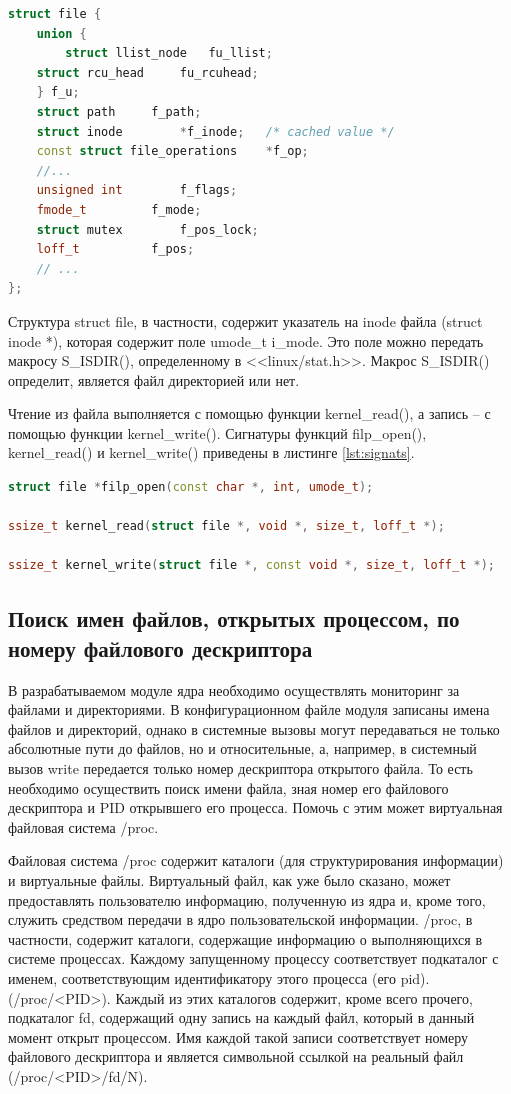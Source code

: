 \documentclass[a4paper,14pt]{article}
\begin{document}
\begin{lstlisting}[language=C++,label={lst:sfile}, caption=\text{struct file для ядра версии 5.4.}]
struct file {
	union {
		struct llist_node	fu_llist;
	struct rcu_head 	fu_rcuhead;
	} f_u;
	struct path		f_path;
	struct inode		*f_inode;	/* cached value */
	const struct file_operations	*f_op;
	//...
	unsigned int 		f_flags;
	fmode_t			f_mode;
	struct mutex		f_pos_lock;
	loff_t			f_pos;
	// ...
};
\end{lstlisting}

Структура struct file, в частности, содержит указатель на inode файла (struct inode *), которая содержит поле umode\_t i\_mode. Это поле можно передать макросу S\_ISDIR(), определенному в <<linux/stat.h>>. Макрос S\_ISDIR() определит, является файл директорией или нет.

Чтение из файла выполняется с помощью функции kernel\_read(), а запись -- с помощью функции kernel\_write(). Сигнатуры функций filp\_open(),  kernel\_read() и kernel\_write() приведены в листинге \ref{lst:signats}.

\newpage
\begin{lstlisting}[language=C++,label={lst:signats}, caption=\text{filp\_open(),  kernel\_read() и kernel\_write() для ядра версии 5.4.}]
struct file *filp_open(const char *, int, umode_t);

ssize_t kernel_read(struct file *, void *, size_t, loff_t *);

ssize_t kernel_write(struct file *, const void *, size_t, loff_t *);
\end{lstlisting}

\subsection{Поиск имен файлов, открытых процессом, по номеру файлового дескриптора}

В разрабатываемом модуле ядра необходимо осуществлять мониторинг за файлами и директориями. В конфигурационном файле модуля записаны имена файлов и директорий, однако в системные вызовы могут передаваться не только абсолютные пути до файлов, но и относительные, а, например, в системный вызов write передается только номер дескриптора открытого файла. То есть необходимо осуществить поиск имени файла, зная номер его файлового дескриптора и PID открывшего его процесса. Помочь с этим может виртуальная файловая система /proc.

Файловая система /proc содержит каталоги (для структурирования информации) и виртуальные файлы. Виртуальный файл, как уже было сказано, может предоставлять пользователю информацию, полученную из ядра и, кроме того, служить средством передачи в ядро пользовательской информации. /proc, в частности, содержит каталоги, содержащие информацию о выполняющихся в системе процессах. Каждому запущенному процессу соответствует подкаталог с именем, соответствующим идентификатору этого процесса (его pid). (/proc/<PID>). Каждый из этих каталогов содержит, кроме всего прочего, подкаталог fd, содержащий одну запись на каждый файл, который в данный момент открыт процессом. Имя каждой такой записи соответствует номеру файлового дескриптора и является символьной ссылкой на реальный файл (/proc/<PID>/fd/N).
\end{document}
